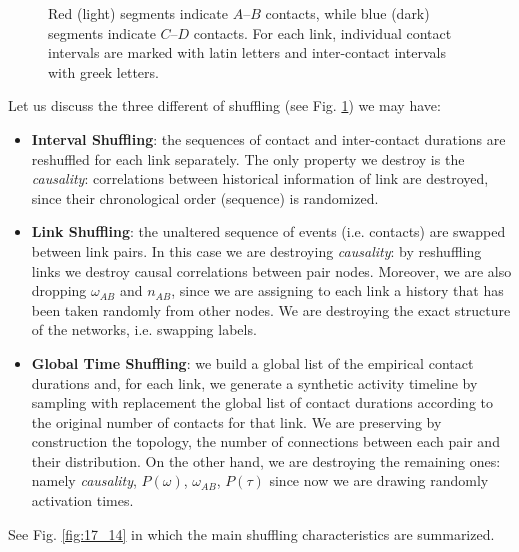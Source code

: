 \documentclass[../main/main.tex]{subfiles}
\begin{document}
\begin{figure}[h!]
\begin{minipage}[c]{0.5\linewidth}
\end{minipage}
\begin{minipage}[]{0.5\linewidth}
\centering
{}
\end{minipage}
\caption{\label{fig:17_15} Red (light) segments indicate $A–B$ contacts, while blue (dark) segments indicate $C–D$ contacts. For each link, individual contact intervals are marked with latin letters and inter-contact intervals with greek letters. }
\end{figure}


Let us discuss the three different of shuffling (see Fig. \ref{fig:17_15}) we may have:
\begin{itemize}
    \item \textbf{Interval Shuffling}: the sequences of contact and inter-contact durations are reshuffled for each link separately. The only property we destroy is the \textit{causality}: correlations between historical information of link are destroyed, since their chronological order (sequence) is randomized.
    \item \textbf{Link Shuffling}: the unaltered sequence of events (i.e. contacts) are swapped between link pairs. In this case we are destroying \textit{causality}: by reshuffling links we destroy causal correlations between pair nodes. Moreover, we are also dropping $\omega_{AB}$ and $n_{AB}$, since we are assigning to each link a history that has been taken randomly from other nodes. We are destroying the exact structure of the networks, i.e. swapping labels.
    \item \textbf{Global Time Shuffling}:  we build a global list of the empirical contact durations and, for each link, we generate a synthetic activity timeline by sampling with replacement the global list of contact durations according to the original number of contacts for that link. We are preserving by construction the topology, the number of connections between each pair and their distribution. On the other hand, we are destroying the remaining ones: namely \textit{causality}, $P(\omega)$, $\omega_{AB}$, $P(\tau)$ since now we are drawing randomly activation times.
\end{itemize}
See Fig. \ref{fig:17_14} in which the main shuffling characteristics are summarized.
\end{document}
